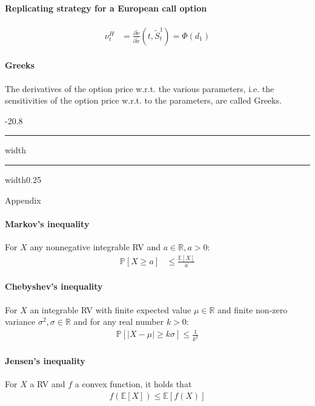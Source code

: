 \documentclass[a4paper,landscape,8pt,fleqn]{scrartcl}
\makeatletter
\renewcommand{\section}{\@startsection{section}{1}{0mm}%
{-2\baselineskip}{0.8\baselineskip}%
{\hrule depth 0.2pt width\columnwidth\hrule depth1.5pt
width0.25\columnwidth\vspace*{1.2em}\Large\bfseries}}
\makeatother
\begin{document}
\begin{multicols*}{3}
\paragraph{Replicating strategy for a European call option}

\begin{align*}
\nu_t^H &= \frac{\partial \tilde \nu}{\partial \tilde x}(t, \tilde S_t^1) = \Phi(d_1)
\end{align*}

\paragraph{Greeks}

The derivatives of the option price w.r.t. the various parameters, i.e. the sensitivities of the option price w.r.t. to the parameters, are called Greeks.

\columnbreak

\section{Appendix}

\paragraph{Markov's inequality}

For $X$ any nonnegative integrable RV and $a \in \mathbb{R}, a > 0$:
\begin{align*}
\mathbb{P}[X \geq a] &\leq \frac{\mathbb{E}[X]}{a}
\end{align*}

\paragraph{Chebyshev's inequality}

For $X$ an integrable RV with finite expected value $\mu \in \mathbb{R}$ and finite non-zero variance $\sigma^2, \sigma \in \mathbb{R}$ and for any real number $k > 0$:
\begin{align*}
\mathbb{P}[|X - \mu| \geq k \sigma] \leq \frac{1}{k^2}
\end{align*}

\paragraph{Jensen's inequality}

For $X$ a RV and $f$ a convex function, it holds that
\begin{align*}
f(\mathbb{E}[X]) \leq \mathbb{E}[f(X)]
\end{align*}


\end{multicols*}
\end{document}
